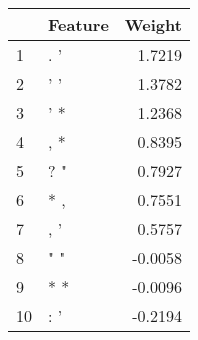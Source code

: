 \begin{tabular}{llr}
\toprule
{} & Feature &  Weight \\
\midrule
1  &     . ' &  1.7219 \\
2  &     ' ' &  1.3782 \\
3  &     ' * &  1.2368 \\
4  &     , * &  0.8395 \\
5  &     ? " &  0.7927 \\
6  &     * , &  0.7551 \\
7  &     , ' &  0.5757 \\
8  &     " " & -0.0058 \\
9  &     * * & -0.0096 \\
10 &     : ' & -0.2194 \\
\bottomrule
\end{tabular}
